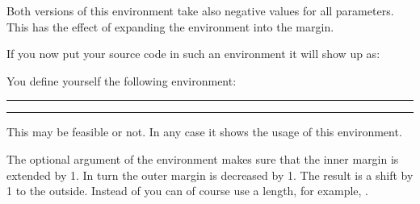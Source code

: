 Both versions of this environment take also negative values for all
parameters. This has the effect of expanding the environment into the
margin.
\IfThisCommonFirstRun{\iftrue}{\csname iffalse\endcsname}
  \begin{Example}
\begin{lstcode}
  \newenvironment{SourceCodeFrame}{%
    \begin{addmargin*}[1em]{-1em}%
      \begin{minipage}{\linewidth}%
        \rule{\linewidth}{2pt}%
  }{%
      \rule[.25\baselineskip]{\linewidth}{2pt}%
      \end{minipage}%
    \end{addmargin*}%
  }
\end{lstcode}
    If you now put your source code in such an environment it will show
    up as:
    \begin{ShowOutput}
      \newenvironment{SourceCodeFrame}{%
        \begin{addmargin*}[1em]{-1em}%
          \begin{minipage}{\linewidth}%
            \rule{\linewidth}{2pt}%
          }{%
            \rule[.25\baselineskip]{\linewidth}{2pt}%
          \end{minipage}%
        \end{addmargin*}%
      }
      You define yourself the following environment:
      \begin{SourceCodeFrame}
\begin{lstcode}
\newenvironment{\SourceCodeFrame}{%
  \begin{addmargin*}[1em]{-1em}%
    \begin{minipage}{\linewidth}%
      \rule{\linewidth}{2pt}%
}{%
    \rule[.25\baselineskip]{\linewidth}{2pt}%
    \end{minipage}%
  \end{addmargin*}%
}
\end{lstcode}
      \end{SourceCodeFrame}
      This may be feasible or not. In any case it shows the usage of this
      environment.
    \end{ShowOutput}
    The optional argument of the  environment
    makes sure that the inner margin is extended by 1. In turn
    the outer margin is decreased by 1. The result is a shift
    by 1 to the outside.  Instead of \PValue{1em} you can of
    course use a length, for example, .
  \end{Example}
\fi%

